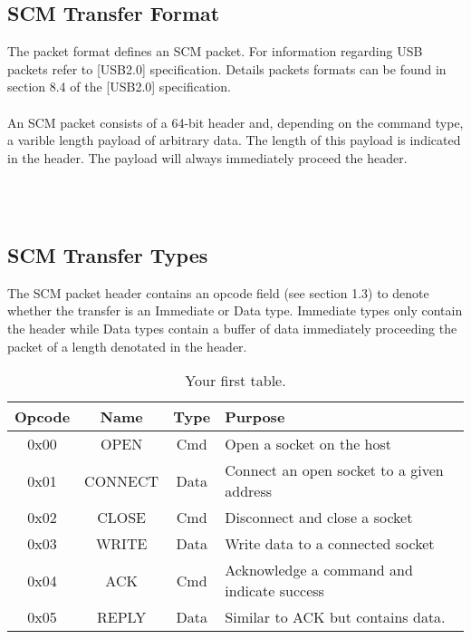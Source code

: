\documentclass[10pt]{article}
\begin{document}
	\subsection{SCM Transfer Format}
	The packet format defines an SCM packet. For information regarding USB packets refer to [USB2.0] specification. Details packets formats can be found in section 8.4 of the [USB2.0] specification. \\
	\\
	An SCM packet consists of a 64-bit header and, depending on the command type, a varible length payload of arbitrary data. The length of this payload is indicated in the header.  The payload will always immediately proceed the header. \\
	\\
	\centerline {
	} \\
	\subsection{SCM Transfer Types}
	The SCM packet header contains an opcode field (see section 1.3) to denote whether the transfer is an Immediate or Data type. Immediate types only contain the header while Data types contain a buffer of data immediately proceeding the packet of a length denotated in the header.\\

	\begin{table}[h!]
		\begin{center}
			\caption{Your first table.}
			\label{tab:table1}
			\begin{tabular}{c|c|c|l} 
				\rowcolor{lightgray}
				\textbf{Opcode} &	\textbf{Name} &	\textbf{Type} & \textbf{Purpose}\\
				\hline
				0x00 & OPEN & Cmd & Open a socket on the host\\
				0x01 & CONNECT & Data & Connect an open socket to a given address\\
				0x02 & CLOSE & Cmd & Disconnect and close a socket\\
				0x03 & WRITE	 & Data & Write data to a connected socket\\
				0x04 & ACK	& Cmd & Acknowledge a command and indicate success\\
				0x05 & REPLY	& Data & Similar to ACK but contains data. \\
			\end{tabular}
		\end{center}
	\end{table}
\end{document}

